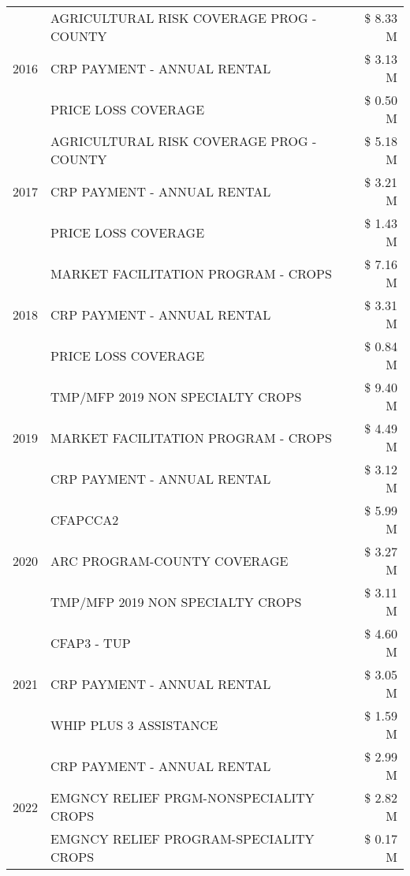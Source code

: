 \begin{tabular}{llr}
\cline{1-3}
\multirow[t]{3}{*}{2016} & AGRICULTURAL RISK COVERAGE PROG - COUNTY & \$ 8.33 M \\
 & CRP PAYMENT - ANNUAL RENTAL & \$ 3.13 M \\
 & PRICE LOSS COVERAGE & \$ 0.50 M \\
\cline{1-3}
\multirow[t]{3}{*}{2017} & AGRICULTURAL RISK COVERAGE PROG - COUNTY & \$ 5.18 M \\
 & CRP PAYMENT - ANNUAL RENTAL & \$ 3.21 M \\
 & PRICE LOSS COVERAGE & \$ 1.43 M \\
\cline{1-3}
\multirow[t]{3}{*}{2018} & MARKET FACILITATION PROGRAM - CROPS & \$ 7.16 M \\
 & CRP PAYMENT - ANNUAL RENTAL & \$ 3.31 M \\
 & PRICE LOSS COVERAGE & \$ 0.84 M \\
\cline{1-3}
\multirow[t]{3}{*}{2019} & TMP/MFP 2019 NON SPECIALTY CROPS & \$ 9.40 M \\
 & MARKET FACILITATION PROGRAM - CROPS & \$ 4.49 M \\
 & CRP PAYMENT - ANNUAL RENTAL & \$ 3.12 M \\
\cline{1-3}
\multirow[t]{3}{*}{2020} & CFAPCCA2 & \$ 5.99 M \\
 & ARC PROGRAM-COUNTY COVERAGE & \$ 3.27 M \\
 & TMP/MFP 2019 NON SPECIALTY CROPS & \$ 3.11 M \\
\cline{1-3}
\multirow[t]{3}{*}{2021} & CFAP3 - TUP & \$ 4.60 M \\
 & CRP PAYMENT - ANNUAL RENTAL & \$ 3.05 M \\
 & WHIP PLUS 3 ASSISTANCE & \$ 1.59 M \\
\cline{1-3}
\multirow[t]{3}{*}{2022} & CRP PAYMENT - ANNUAL RENTAL & \$ 2.99 M \\
 & EMGNCY RELIEF PRGM-NONSPECIALITY CROPS & \$ 2.82 M \\
 & EMGNCY RELIEF PROGRAM-SPECIALITY CROPS & \$ 0.17 M \\
\cline{1-3}
\bottomrule
\end{tabular}
